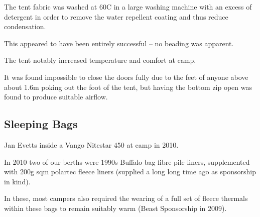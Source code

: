 The tent fabric was washed at 60C in a large washing machine with an
excess of detergent in order to remove the water repellent coating and
thus reduce condensation.

This appeared to have been entirely successful -- no beading was
apparent.

The tent notably increased temperature and comfort at camp.

It was found impossible to close the doors fully due to the feet of
anyone above about 1.6m poking out the foot of the tent, but having the
bottom zip open was found to produce suitable airflow.


\subsection{Sleeping Bags}

\begin{marginfigure}
\checkoddpage \ifoddpage \forcerectofloat \else \forceversofloat \fi
\centering
 \caption{Jan Evetts inside a Vango Nitestar 450 at camp \protect{} in 2010. }
 \label{nitestar 450}
\end{marginfigure}

In 2010 two of our berths were 1990s Buffalo bag fibre-pile liners, supplemented with 200g sqm polartec fleece liners (supplied a long long time ago as sponsorship in kind).

In these, most campers also required the wearing of a full set of fleece thermals within these bags to remain suitably warm (Beast Sponsorship in 2009).

